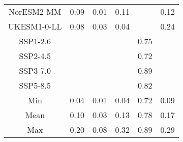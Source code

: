\begin{table*}[t]
\begin{tabular}{c|rrr|rr}
NorESM2-MM & 0.09 & 0.01 & 0.11 &  & 0.12 \\
UKESM1-0-LL & 0.08 & 0.03 & 0.04 &  & 0.24 \\
SSP1-2.6 &  &  &  & 0.75 &  \\
SSP2-4.5 &  &  &  & 0.72 &  \\
SSP3-7.0 &  &  &  & 0.89 &  \\
SSP5-8.5 &  &  &  & 0.82 &  \\
\midrule
Min & 0.04 & 0.01 & 0.04 & 0.72 & 0.09 \\
Mean & 0.10 & 0.03 & 0.13 & 0.78 & 0.17 \\
Max & 0.20 & 0.08 & 0.32 & 0.89 & 0.29 \\
\bottomrule
\end{tabular}
\end{table*}
